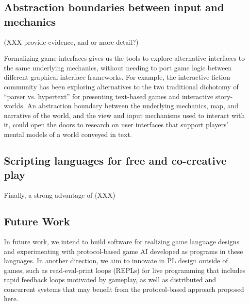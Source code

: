 \subsection{Abstraction boundaries between input and mechanics}

(XXX provide evidence, and or more detail?)

Formalizing game interfaces gives us the tools to explore alternative
interfaces to the same underlying mechanics, without needing to port
game logic between different graphical interface frameworks. For example,
the interactive fiction community has been exploring alternatives to the
two traditional dichotomy of ``parser vs. hypertext'' for presenting
text-based games and interactive story-worlds. An abstraction boundary
between the underlying mechanics, map, and narrative of the world, and the
view and input mechanisms used to interact with it, could open the doors to
research on user interfaces that support players' mental models of a world
conveyed in text.

\subsection{Scripting languages for free and co-creative play}

Finally, a strong advantage of (XXX)


\subsection{Future Work}
  In future work, we intend to build software for realizing game language
  designs and experimenting with protocol-based game AI developed as
  programs in these languages. In another direction, we aim to innovate in
  PL design outside of games, such as read-eval-print loops (REPLs) for
  live programming that includes rapid feedback loops motivated by
  gameplay, as well as distributed and concurrent systems that may benefit
  from the protocol-based approach proposed here.

